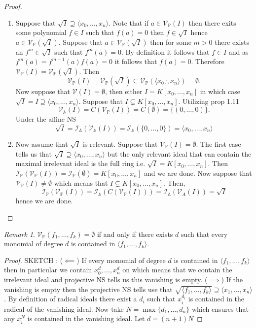 \documentclass[40pt]{article}
\newcommand{\Proj}{\mathbb{P}}
\newcommand{\A}{\mathbb{A}}
\newcommand{\I}{\mathcal{I}}
\newcommand{\V}{\mathcal{V}}
\newcommand{\la}{\langle}
\newcommand{\ra}{\rangle}
\theoremstyle{remark}
\newtheorem{remark}[theorem]{Remark}
\begin{document}
		\begin{proof}
			\begin{enumerate}
				\item[(a)] Suppose that $\sqrt{I} \supseteq \la x_0,\dots,x_n\ra$. Note that if $a \in \V_\Proj(I)$ then there exits some polynomial $f \in I$ such that $f(a) = 0$ then $f \in \sqrt{I}$ hence $a \in \V_\Proj(\sqrt{I})$. Suppose that $a \in \V_\Proj(\sqrt{I})$ then for some $m > 0$ there exists an $f^m \in \sqrt{I}$ such that $f^m(a) = 0$. By definition it follows that $f \in I$ and as $f^m(a) = f^{m-1}(a)f(a) = 0$ it follows that $f(a) = 0$. Therefore $\V_\Proj(I) = \V_\Proj(\sqrt{I})$. Then 
				\[
				\V_\Proj(I) = \V_\Proj(\sqrt{I}) \subseteq \V_\Proj(\la x_0, \dot, x_n \ra) = \emptyset.
				\]
				Now suppose that $\V(I) = \emptyset$, then either $I = K[x_0,\dots,x_n]$ in which case $\sqrt{I} = I \supseteq \la x_0,\dots,x_n\ra$. Suppose that $I \subsetneq K[x_0,\dots,x_n]$. Utilizing prop 1.11 
				\[
				\V_\A(I) = C(\V_\Proj(I)) = C(\emptyset) = \{(0,\dots,0)\}.
				\]
				Under the affine NS
				\[
				\sqrt{I} = \I_\A(\V_\A(I)) = \I_\A(\{0,\dots,0\}) = \la x_0,\dots,x_n\ra
				\]
				\item[(b)] Now assume that $\sqrt{I}$ is relevant. Suppose that $\V_\Proj(I) = \emptyset$. The first case tells us that $\sqrt{I} \supseteq \la x_0,\dots,x_n\ra$ but the only relevant ideal that can contain the maximal irrelevant ideal is the full ring i.e. $\sqrt{I} = K[x_0,\dots,x_n]$. Then $\I_\Proj(\V_\Proj(I)) = \I_\Proj(\emptyset) = K[x_0,\dots,x_n]$ and we are done. Now suppose that $\V_\Proj(I) \neq \emptyset$ which means that $I \subsetneq K[x_0,\dots,x_n]$. Then, 
				\[
				\I_\Proj(\V_\Proj(I)) = \I_\A(C(\V_\Proj(I))) = \I_\A(\V_A(I)) = \sqrt{I}
				\]
				hence we are done.
			\end{enumerate}
		\end{proof}
		
		\begin{remark}
			$\V_\Proj(f_1,\dots,f_k) = \emptyset$ if and only if there exists $d$ such that every monomial of degree $d$ is contained in $\la f_1,\dots, f_k\ra$. 
			\begin{proof}
				SKETCH : ($\impliedby$) If every monomial of degree $d$ is contained in $\la f_1,\dots,f_k\ra$ then in particular we contain $x_0^d,\dots,x_n^d$ on which means that we contain the irrelevant ideal and projective NS tells us this vanishing is empty. ($\implies$) If the vanishing is empty then the projective NS tells use that $\sqrt{\la f_1,\dots,f_k \ra} \supseteq \la x_1,\dots,x_n \ra$. By definition of radical ideals there exist a $d_i$ such that $x_i^{d_i}$ is contained in the radical of the vanishing ideal. Now take $N = \max\{d_1,\dots,d_n\}$ which ensures that any $x_i^N$ is contained in the vanishing ideal. Let $d = (n+1)N$
			\end{proof}
		\end{remark}
\end{document}
